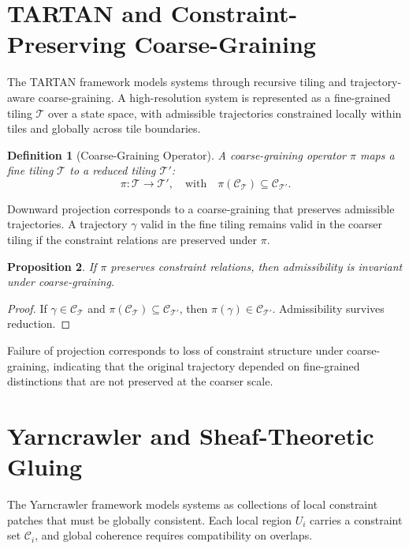 \documentclass[12pt, a4paper]{article}
\newtheorem{definition}{Definition}[section]
\newtheorem{proposition}[definition]{Proposition}
\begin{document}
\section{TARTAN and Constraint-Preserving Coarse-Graining}

The TARTAN framework models systems through recursive tiling and trajectory-aware coarse-graining. A high-resolution system is represented as a fine-grained tiling $\mathcal{T}$ over a state space, with admissible trajectories constrained locally within tiles and globally across tile boundaries.

\begin{definition}[Coarse-Graining Operator]
A coarse-graining operator $\pi$ maps a fine tiling $\mathcal{T}$ to a reduced tiling $\mathcal{T}'$:
\[
\pi : \mathcal{T} \to \mathcal{T}', \quad \text{with} \quad \pi(\mathcal{C}_\mathcal{T}) \subseteq \mathcal{C}_{\mathcal{T}'}.
\]
\end{definition}

Downward projection corresponds to a coarse-graining that preserves admissible trajectories. A trajectory $\gamma$ valid in the fine tiling remains valid in the coarser tiling if the constraint relations are preserved under $\pi$.

\begin{proposition}
If $\pi$ preserves constraint relations, then admissibility is invariant under coarse-graining.
\end{proposition}

\begin{proof}
If $\gamma \in \mathcal{C}_\mathcal{T}$ and $\pi(\mathcal{C}_\mathcal{T}) \subseteq \mathcal{C}_{\mathcal{T}'}$, then $\pi(\gamma) \in \mathcal{C}_{\mathcal{T}'}$. Admissibility survives reduction.
\end{proof}

Failure of projection corresponds to loss of constraint structure under coarse-graining, indicating that the original trajectory depended on fine-grained distinctions that are not preserved at the coarser scale.

\section{Yarncrawler and Sheaf-Theoretic Gluing}

The Yarncrawler framework models systems as collections of local constraint patches that must be globally consistent. Each local region $U_i$ carries a constraint set $\mathcal{C}_i$, and global coherence requires compatibility on overlaps.
\end{document}

